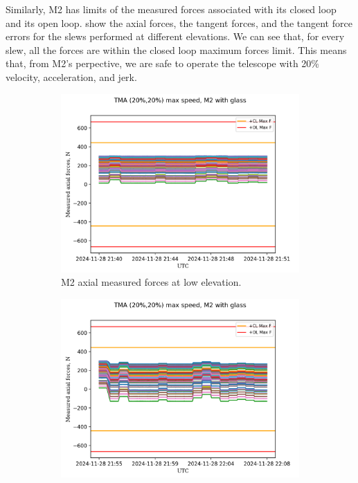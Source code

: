 Similarly, M2 has limits of the measured forces associated with its closed loop and its
open loop.
show the axial forces, the tangent forces, and the tangent
force errors for the slews performed at different elevations. We can see that, for every slew,
all the forces are within the closed loop maximum forces limit. This means that, from M2's
perpective, we are safe to operate the telescope with 20\% velocity, acceleration, and jerk.

\begin{figure}
    \centering
    \begin{subfigure}[b]{0.45\textwidth}
        \centering
        \includegraphics[width=\textwidth]{spa/20_vel_acc_jerk/BLOCK-T227_m2_axial_measured_forces.png}
        \caption{M2 axial measured forces at low elevation.}
        \label{fig:block227_m2_axial_measured_forces}
    \end{subfigure}
    \hfill
    \begin{subfigure}[b]{0.45\textwidth}
        \centering
        \includegraphics[width=\textwidth]{spa/20_vel_acc_jerk/BLOCK-T293_m2_axial_measured_forces.png}

\end{subfigure}
\end{figure}
